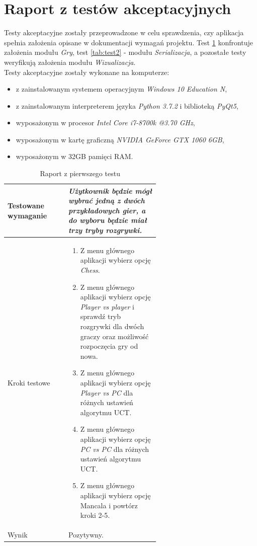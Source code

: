 \documentclass{article}
\let\oldsection\section
\renewcommand\section{\clearpage\oldsection}
\newcommand{\modulename}[1]{\textit{#1}}
\begin{document}
\section{Raport z testów akceptacyjnych}
Testy akceptacyjne zostały przeprowadzone w celu sprawdzenia, czy aplikacja spełnia założenia opisane w dokumentacji wymagań projektu. Test \ref{tab:test1} konfrontuje założenia modułu \modulename{Gry}, test \ref{tab:test2} - modułu \modulename{Serializacja}, a pozostałe testy weryfikują założenia modułu \modulename{Wizualizacja}. \\

\noindent Testy akceptacyjne zostały wykonane na komputerze:
\begin{itemize}
	\item z zainstalowanym systemem operacyjnym \modulename{Windows 10 Education N},
	\item z zainstalowanym interpreterem języka \modulename{Python 3.7.2} i biblioteką \modulename{PyQt5},
	\item wyposażonym w procesor \modulename{Intel Core i7-8700k @3.70 GHz},
	\item wyposażonym w kartę graficzną \modulename{NVIDIA GeForce GTX 1060 6GB},
	\item wyposażonym w 32GB pamięci RAM.
\end{itemize}

\begin{table}[h!]
\centering
\begin{tabular}{|l|p{0.6\linewidth}|}
	\hline
	Testowane wymaganie & \modulename{Użytkownik będzie mógł wybrać jedną z dwóch przykładowych gier, a do wyboru będzie miał trzy tryby rozgrywki.} \\ \hline
	Kroki testowe & \begin{enumerate} \item Z menu głównego aplikacji wybierz opcję \modulename{Chess}. \item Z menu głównego aplikacji wybierz opcję \modulename{Player vs player} i sprawdź tryb rozgrywki dla dwóch graczy oraz możliwość rozpoczęcia gry od nowa. \item Z menu głównego aplikacji wybierz opcję \modulename{Player vs PC} dla różnych ustawień algorytmu UCT. \item Z menu głównego aplikacji wybierz opcję \modulename{PC vs PC} dla różnych ustawień algorytmu UCT. \item Z menu głównego aplikacji wybierz opcję {Mancala} i powtórz kroki 2-5. \end{enumerate} \\ \hline
	Wynik & Pozytywny. \\ \hline
\end{tabular}
\caption{Raport z pierwszego testu}
\label{tab:test1}
\end{table}
\end{document}

